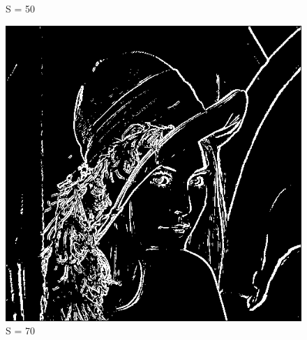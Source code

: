 \documentclass[11pt]{article}
\begin{document}
\begin{figure}[H]
\begin{minipage}[c]{.30\linewidth}
			\caption{S = 50}
			\label{fig:seuilFixe50}
		\end{minipage} \hfill
		\begin{minipage}[c]{.30\linewidth}
			\centering
			\includegraphics[scale=0.15]{Image/seuilFixe70.png}
			\caption{S = 70}
			\label{fig:seuilFixe70}
		\end{minipage}


\end{figure}
\end{document}
